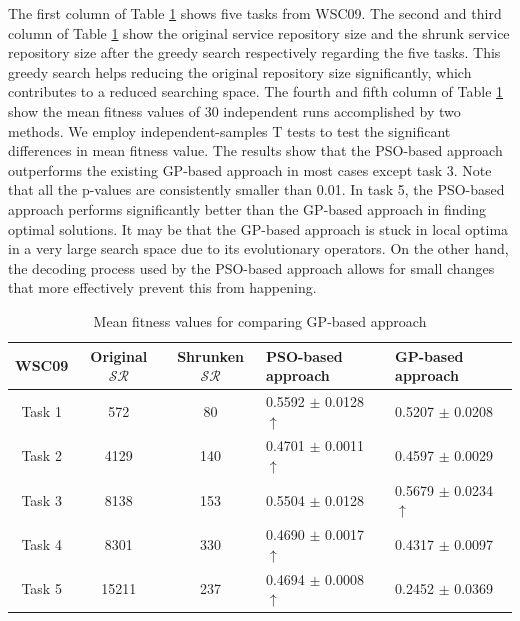 \documentclass{llncs}
\begin{document}
The first column of Table \ref{meanFitness} shows five tasks from WSC09. The second and third column of Table \ref{meanFitness} show the original service repository size and the shrunk service repository size after the greedy search respectively regarding the five tasks. This greedy search helps reducing the original repository size significantly, which contributes to a reduced searching space. The fourth and fifth column of Table \ref{meanFitness} show the mean fitness values of 30 independent runs accomplished by two methods. We employ independent-samples T tests to test the significant differences in mean fitness value. The results show that the PSO-based approach outperforms the existing GP-based approach in most cases except task 3. Note that all the p-values are consistently smaller than 0.01. In task 5, the PSO-based approach performs significantly better than the GP-based approach in finding optimal solutions. It may be that the GP-based approach is stuck in local optima in a very large search space due to its evolutionary operators. On the other hand, the decoding process used by the PSO-based approach allows for small changes that more effectively prevent this from happening.
\vspace{-0.8cm}
\begin{table}[]
\centering
\caption{Mean fitness values for comparing GP-based approach}
\label{meanFitness}
\begin{tabular}{c|c|c|l|l}
\hline
\multicolumn{1}{c|}{WSC09} &Original $\mathcal{SR}$  &Shrunken $\mathcal{SR}$   &PSO-based approach & GP-based approach  \\ \hline
Task 1                     &572            &80    &0.5592 $\pm$ 0.0128  $\uparrow$  &0.5207 $\pm$ 0.0208           \\ \hline
Task 2                     &4129           &140   &0.4701 $\pm$ 0.0011  $\uparrow$  &0.4597 $\pm$ 0.0029          \\ \hline
Task 3                     &8138           &153   &0.5504 $\pm$ 0.0128              &0.5679 $\pm$ 0.0234 $\uparrow$   \\ \hline
Task 4                     &8301           &330   &0.4690 $\pm$ 0.0017  $\uparrow$  &0.4317 $\pm$ 0.0097            \\ \hline
Task 5                     &15211          &237   &0.4694 $\pm$ 0.0008  $\uparrow$  &0.2452 $\pm$ 0.0369            \\ \hline
\end{tabular}
\end{table}
\vspace{-0.8cm}
\end{document}
